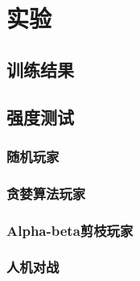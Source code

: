 \chapter{实验}
\label{chap:experiment}

\section{训练结果}


\section{强度测试}

\subsection{随机玩家}

\subsection{贪婪算法玩家}

\subsection{Alpha-beta剪枝玩家}

\subsection{人机对战}

